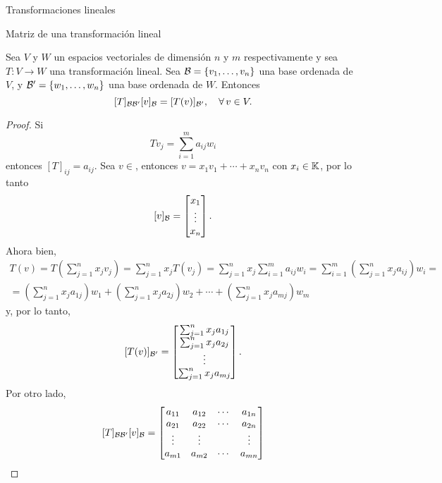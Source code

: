 \begin{chapter}{Transformaciones lineales}
\begin{section}{Matriz de una transformaci\'on lineal}
            \begin{proposicion}\label{prop-matriz-de-tv} 	Sea $V$  y $W$ un espacios vectoriales de dimensión $n$ y $m$ respectivamente y sea $T: V \to W$ una transformación lineal. Sea $\mathcal{B} = \{v_1,\ldots,v_n\}$ una base ordenada de $V$, y $\mathcal{B}' = \{w_1,\ldots,w_n\}$ una base ordenada de $W$. Entonces
            \begin{equation}\label{matriz-de-tl-2}
            [T]_{\mathcal{B} \mathcal{B}'} [v]_{\mathcal{B}} = [T(v)]_{\mathcal{B}'}, \quad \forall \,v \in V.
            \end{equation}	
            \end{proposicion}
        \begin{proof}
            Si 
            \begin{equation*}
            Tv_j = \sum_{i=1}^{m} a_{ij} w_i
            \end{equation*}
            entonces $[T]_{ij} = a_{ij}$. Sea $v \in $,  entonces $v = x_1v_1+\cdots+x_n v_n$ con $x_i \in \mathbb K$, por lo tanto 
            $$
            [v]_{\mathcal{B}} = \begin{bmatrix} x_1\\ \vdots\\x_n\end{bmatrix}.
            $$
            Ahora bien,
            \begin{multline*}
                T(v) = T(\sum_{j=1}^{n}x_jv_j) = \sum_{j=1}^{n}x_jT(v_j) =  \sum_{j=1}^{n}x_j\sum_{i=1}^{m} a_{ij} w_i = \sum_{i=1}^{m} (\sum_{j=1}^{n}x_ja_{ij}) w_i =\\
                = ( \sum_{j=1}^{n}x_ja_{1j})w_1+(\sum_{j=1}^{n}x_ja_{2j})w_2+\cdots+(\sum_{j=1}^{n}x_ja_{mj})w_m
            \end{multline*}
            y, por lo tanto,
            \begin{equation}\label{eq-45}
            [T(v)]_{\mathcal{B}'} = \begin{bmatrix}  \sum_{j=1}^{n}x_ja_{1j}\\\sum_{j=1}^{n}x_ja_{2j}\\ \vdots\\\sum_{j=1}^{n}x_ja_{mj}\end{bmatrix}.
            \end{equation}
            Por otro lado, 
            \begin{equation}\label{eq-46}
            [T]_{\cB \cB'} [v]_{\cB} = 
            \begin{bmatrix} a_{11} &a_{12}&\cdots & a_{1n}
            \\a_{21} &a_{22}&\cdots & a_{2n}\\ \vdots &\vdots&& \vdots \\ a_{m1} &a_{m2}& \cdots & a_{mn}\end{bmatrix}

\end{equation}
\end{proof}
\end{section}
\end{chapter}

